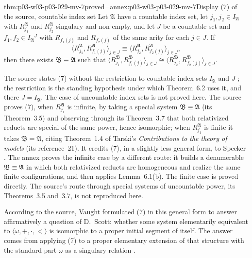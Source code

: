 \begin{hbtheorem}{thm:p03-w03-p03-029-mv-7}{proved=annex:p03-w03-p03-029-mv-7}{Display (7) of the source, countable index set}
Let \(\mathfrak A\) have a countable index set, let \(j_1,j_2\in
I_{\mathfrak A}\) with \(R_{j_1}^{\mathfrak A}\) and \(R_{j_2}^{\mathfrak
A}\) singulary and non-empty, and let \(J\) be a countable set and
\(f_1,f_2\in I_{\mathfrak A}{}^J\) with
\(R_{f_1(j)}\) and \(R_{f_2(j)}\) of the same arity for each \(j\in J\). If
\[
  \langle R_{j_1}^{\mathfrak A},R_{f_1(j)}^{\mathfrak A}\rangle_{j\in J}
  \equiv
  \langle R_{j_2}^{\mathfrak A},R_{f_2(j)}^{\mathfrak A}\rangle_{j\in J},
\]
then there exists \(\mathfrak B\equiv\mathfrak A\) such that
\(\langle R_{j_1}^{\mathfrak B},R_{f_1(j)}^{\mathfrak B}\rangle_{j\in
J}\cong\langle R_{j_2}^{\mathfrak B},R_{f_2(j)}^{\mathfrak B}\rangle_{j\in
J}\).
\end{hbtheorem}

The source states (7) without the restriction to countable index sets
\(I_{\mathfrak A}\) and \(J\) \cite[p.~51, display~(7)]{MorleyVaught1962};
the restriction is the standing hypothesis under which Theorem~6.2 uses it,
and there \(J=I_{\mathfrak A}\). The case of uncountable index sets is not
proved here. The source proves (7), when
\(R_{j_1}^{\mathfrak A}\) is infinite, by taking a special system
\(\mathfrak B\equiv\mathfrak A\) (its Theorem~3.5) and observing through its
Theorem~3.7 that both relativized reducts are special of the same power, hence
isomorphic; when \(R_{j_1}^{\mathfrak A}\) is finite it takes
\(\mathfrak B=\mathfrak A\), citing Theorem~1.4 of Tarski's
\emph{Contributions to the theory of models} (its reference~21). It credits (7), in a
slightly less general form, to Specker \cite[p.~51 and
footnote~11]{MorleyVaught1962}. The annex proves the infinite case by a
different route: it builds a denumerable \(\mathfrak B\equiv\mathfrak A\) in
which both relativized reducts are homogeneous and realize the same finite
configurations, and then applies Lemma~6.1(b). The finite case is proved
directly. The source's route through special systems of uncountable power,
its Theorems~3.5 and~3.7, is not reproduced here.

According to the source, Vaught formulated (7) in this general form to
answer affirmatively a question of D.~Scott: whether some system
elementarily equivalent to \(\langle\omega,+,\cdot,<\rangle\) is isomorphic to
a proper initial segment of itself. The answer comes from applying (7) to a
proper elementary extension of that structure with the standard part
\(\omega\) as a singulary relation \cite[p.~51]{MorleyVaught1962}.

